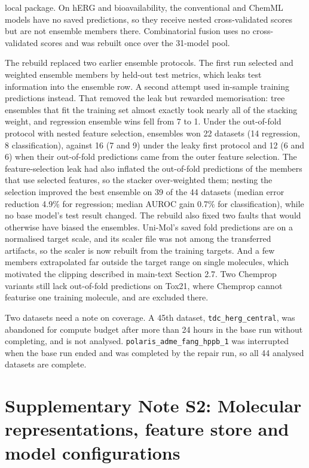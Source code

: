 \documentclass[11pt,a4paper]{article}
\begin{document}
local package. On hERG and bioavailability, the conventional and ChemML models have no saved predictions, so they receive nested cross-validated scores but are not ensemble members there. Combinatorial fusion uses no cross-validated scores and was rebuilt once over the 31-model pool.

The rebuild replaced two earlier ensemble protocols. The first run selected and weighted ensemble members by held-out test metrics, which leaks test information into the ensemble row. A second attempt used in-sample training predictions instead. That removed the leak but rewarded memorisation: tree ensembles that fit the training set almost exactly took nearly all of the stacking weight, and regression ensemble wins fell from 7 to 1. Under the out-of-fold protocol with nested feature selection, ensembles won 22 datasets (14 regression, 8 classification), against 16 (7 and 9) under the leaky first protocol and 12 (6 and 6) when their out-of-fold predictions came from the outer feature selection. The feature-selection leak had also inflated the out-of-fold predictions of the members that use selected features, so the stacker over-weighted them; nesting the selection improved the best ensemble on 39 of the 44 datasets (median error reduction 4.9\% for regression; median AUROC gain 0.7\% for classification), while no base model's test result changed. The rebuild also fixed two faults that would otherwise have biased the ensembles. Uni-Mol's saved fold predictions are on a normalised target scale, and its scaler file was not among the transferred artifacts, so the scaler is now rebuilt from the training targets. And a few members extrapolated far outside the target range on single molecules, which motivated the clipping described in main-text Section 2.7. Two Chemprop variants still lack out-of-fold predictions on Tox21, where Chemprop cannot featurise one training molecule, and are excluded there.

Two datasets need a note on coverage. A 45th dataset, \texttt{tdc\_herg\_central}, was abandoned for compute
budget after more than 24 hours in the base run without completing, and is not analysed. \texttt{polaris\_adme\_fang\_hppb\_1}
was interrupted when the base run ended and was completed by the repair run, so all 44 analysed datasets are complete.

\clearpage
\section*{Supplementary Note S2: Molecular representations, feature store and model configurations}\label{note:config}
\end{document}
